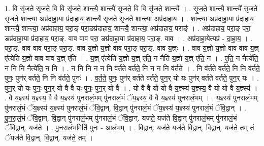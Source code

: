 \documentclass[17pt]{extarticle}
\begin{document}
1. वि सृ॑जते सृजते॒ वि वि सृ॑जते॒ शान्त्यै॒ शान्त्यै॑ सृजते॒ वि वि सृ॑जते॒ शान्त्यै᳚ । . सृ॒ज॒ते॒ शान्त्यै॒ शान्त्यै॑ सृजते सृजते॒ शान्त्या॒ अप्र॑दाहा॒या प्र॑दाहाय॒ शान्त्यै॑ सृजते सृजते॒ शान्त्या॒ अप्र॑दाहाय । . शान्त्या॒ अप्र॑दाहा॒या प्र॑दाहाय॒ शान्त्यै॒ शान्त्या॒ अप्र॑दाहाय॒ परा॒ङ् परा॒ङप्र॑दाहाय॒ शान्त्यै॒ शान्त्या॒ अप्र॑दाहाय॒ पराङ्॑ । . अप्र॑दाहाय॒ परा॒ङ् परा॒ ङप्र॑दाहा॒या प्र॑दाहाय॒ परा॒ङ्. वाव वाव परा॒ ङप्र॑दाहा॒या प्र॑दाहाय॒ परा॒ङ्. वाव । . अप्र॑दाहा॒येत्यप्र॑ - दा॒हा॒य॒ । . परा॒ङ्. वाव वाव परा॒ङ् परा॒ङ्. वाव य॒ज्ञो य॒ज्ञो वाव परा॒ङ् परा॒ङ्. वाव य॒ज्ञ्ः । . वाव य॒ज्ञो य॒ज्ञो वाव वाव य॒ज्ञ् ए᳚त्येति य॒ज्ञो वाव वाव य॒ज्ञ् ए॑ति । . य॒ज्ञ् ए᳚त्येति य॒ज्ञो य॒ज्ञ् ए॑ति॒ न नैति॑ य॒ज्ञो य॒ज्ञ् ए॑ति॒ न । . ए॒ति॒ न नैत्ये॑ति॒ न नि नि नैत्ये॑ति॒ न नि । . न नि नि न न नि व॑र्तते वर्तते॒ नि न न नि व॑र्तते । . नि व॑र्तते वर्तते॒ नि नि व॑र्तते॒ पुनः॒ पुन॑र् वर्तते॒ नि नि व॑र्तते॒ पुनः॑ । . व॒र्त॒ते॒ पुनः॒ पुन॑र् वर्तते वर्तते॒ पुन॒र् यो यः पुन॑र् वर्तते वर्तते॒ पुन॒र् यः । . पुन॒र् यो यः पुनः॒ पुन॒र् यो वै वै यः पुनः॒ पुन॒र् यो वै । . यो वै वै यो यो वै य॒ज्ञ्स्य॑ य॒ज्ञ्स्य॒ वै यो यो वै य॒ज्ञ्स्य॑ । . वै य॒ज्ञ्स्य॑ य॒ज्ञ्स्य॒ वै वै य॒ज्ञ्स्य॑ पुनरालं॒भम् पु॑नरालं॒भं ॅय॒ज्ञ्स्य॒ वै वै य॒ज्ञ्स्य॑ पुनरालं॒भम् । . य॒ज्ञ्स्य॑ पुनरालं॒भम् पु॑नरालं॒भं ॅय॒ज्ञ्स्य॑ य॒ज्ञ्स्य॑ पुनरालं॒भं ॅवि॒द्वान्. वि॒द्वान् पु॑नरालं॒भं ॅय॒ज्ञ्स्य॑ य॒ज्ञ्स्य॑ पुनरालं॒भं ॅवि॒द्वान् । . पु॒न॒रा॒लं॒भं ॅवि॒द्वान्. वि॒द्वान् पु॑नरालं॒भम् पु॑नरालं॒भं ॅवि॒द्वान्. यज॑ते॒ यज॑ते वि॒द्वान् पु॑नरालं॒भम् पु॑नरालं॒भं ॅवि॒द्वान्. यज॑ते । . पु॒न॒रा॒लं॒भमिति॑ पुनः - आ॒लं॒भम् । . वि॒द्वान्. यज॑ते॒ यज॑ते वि॒द्वान्. वि॒द्वान्. यज॑ते॒ तम् तं ॅयज॑ते वि॒द्वान्. वि॒द्वान्. यज॑ते॒ तम् । \newline
\end{document}
